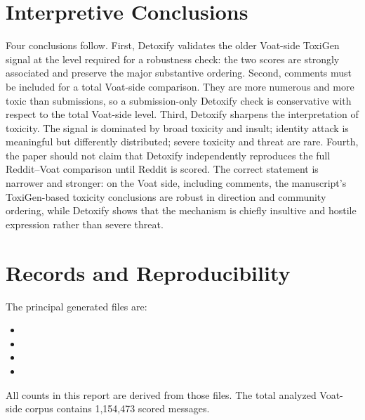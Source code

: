 \documentclass[11pt,letterpaper]{article}
\begin{document}
\section{Interpretive Conclusions}
Four conclusions follow.  First, Detoxify validates the older Voat-side ToxiGen signal at the level required for a robustness check: the two scores are strongly associated and preserve the major substantive ordering.  Second, comments must be included for a total Voat-side comparison.  They are more numerous and more toxic than submissions, so a submission-only Detoxify check is conservative with respect to the total Voat-side level.  Third, Detoxify sharpens the interpretation of toxicity.  The signal is dominated by broad toxicity and insult; identity attack is meaningful but differently distributed; severe toxicity and threat are rare.  Fourth, the paper should not claim that Detoxify independently reproduces the full Reddit--Voat comparison until Reddit is scored.  The correct statement is narrower and stronger: on the Voat side, including comments, the manuscript's ToxiGen-based toxicity conclusions are robust in direction and community ordering, while Detoxify shows that the mechanism is chiefly insultive and hostile expression rather than severe threat.

\section{Records and Reproducibility}
The principal generated files are:
\begin{itemize}
  \item {}
  \item {}
  \item {}
  \item {}
\end{itemize}
All counts in this report are derived from those files.  The total analyzed Voat-side corpus contains 1,154,473 scored messages.
\end{document}
